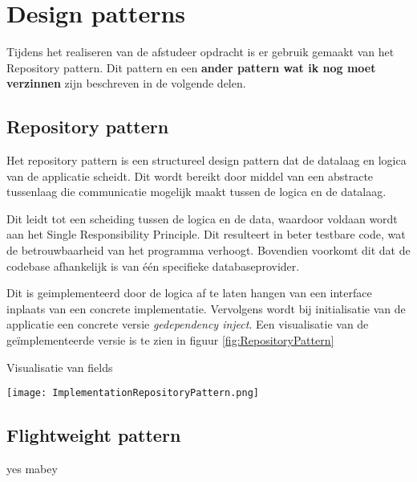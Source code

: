 \section{Design patterns}
Tijdens het realiseren van de afstudeer opdracht is er gebruik gemaakt van het Repository pattern.
Dit pattern en een \textbf{ander pattern wat ik nog moet verzinnen} zijn beschreven in de volgende delen.

\subsection{Repository pattern}
Het repository pattern is een structureel design pattern dat de datalaag en logica van de applicatie scheidt.
Dit wordt bereikt door middel van een abstracte tussenlaag die communicatie mogelijk maakt tussen de logica en de datalaag.

\whitespace
Dit leidt tot een scheiding tussen de logica en de data, waardoor voldaan wordt aan het Single Responsibility Principle.
Dit resulteert in beter testbare code, wat de betrouwbaarheid van het programma verhoogt.
Bovendien voorkomt dit dat de codebase afhankelijk is van één specifieke databaseprovider.

\whitespace
Dit is geimplementeerd door de logica af te laten hangen van een interface inplaats van een concrete implementatie.
Vervolgens wordt bij initialisatie van de applicatie  een concrete versie \textit{gedependency inject}.
Een visualisatie van de geïmplementeerde versie is te zien in figuur \ref{fig:RepositoryPattern}

\whitespace[2]
\begin{graphic}
    \captionsetup{type=figure}
    \caption{Visualisatie van fields}
    \texttt{[image: ImplementationRepositoryPattern.png]}
    \label{fig:RepositoryPattern}
\end{graphic}

\subsection{Flightweight pattern}
yes mabey

